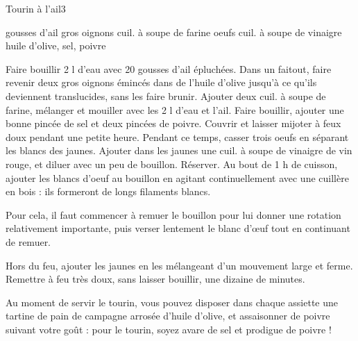 \begin{recette}{Tourin à l'ail}{3}{}{}
\begin{ingredients}
 gousses d'ail
 gros oignons
 cuil. à soupe de farine
 oeufs
 cuil. à soupe de vinaigre
\ingredient huile d'olive, sel, poivre
\end{ingredients}

\begin{preparation}
\etape Faire bouillir 2 l d'eau avec 20 gousses d'ail épluchées.
\etape Dans un faitout, faire revenir deux gros oignons émincés dans de l'huile d'olive jusqu'à ce qu'ils deviennent translucides, sans les faire brunir.
\etape Ajouter deux cuil. à soupe de farine, mélanger et mouiller avec les 2 l d'eau et l'ail.
\etape Faire bouillir, ajouter une bonne pincée de sel et deux pincées de poivre.
\etape Couvrir et laisser mijoter à feux doux pendant une petite heure.
\etape Pendant ce temps, casser trois oeufs en séparant les blancs des jaunes.
\etape Ajouter dans les jaunes une cuil. à soupe de vinaigre de vin rouge, et diluer avec un peu de bouillon. Réserver.
\etape Au bout de 1 h de cuisson, ajouter les blancs d'oeuf au bouillon en agitant continuellement avec une cuillère en bois : ils formeront de longs filaments blancs.
\begin{remarque}
Pour cela, il faut commencer à remuer le bouillon pour lui donner une rotation relativement importante, puis verser lentement le blanc d'œuf tout en continuant de remuer.
\end{remarque}
\etape Hors du feu, ajouter les jaunes en les mélangeant d'un mouvement large et ferme.
\etape Remettre à feu très doux, sans laisser bouillir, une dizaine de minutes.
\end{preparation}

\begin{remarque}
Au moment de servir le tourin, vous pouvez disposer dans chaque assiette une tartine de pain de campagne arrosée d'huile d'olive, et assaisonner de poivre suivant votre goût : pour le tourin, soyez avare de sel et prodigue de poivre !
\end{remarque}
\end{recette}
